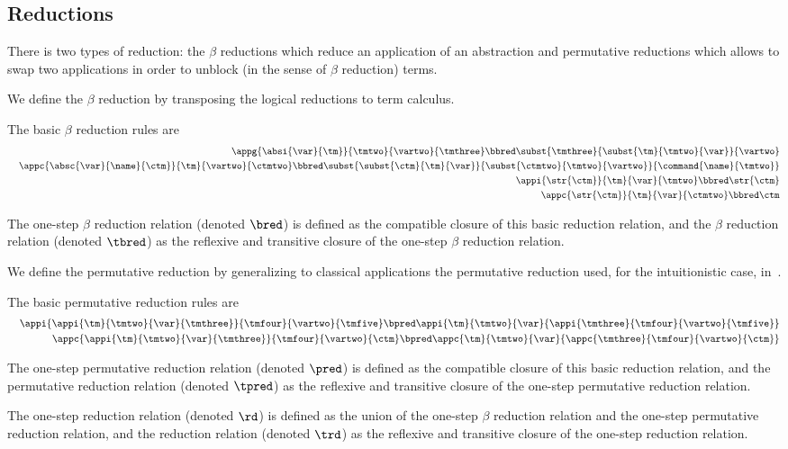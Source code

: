\subsection{Reductions}
There is two types of reduction: the $\beta$ reductions which reduce an application of an abstraction and permutative reductions which allows to swap two applications in order to unblock (in the sense of $\beta$ reduction) terms.

We define the $\beta$ reduction by transposing the logical reductions to term calculus.

\begin{definition}
  The basic $\beta$ reduction rules are
  \begin{eqnarray*}
    &&\appg{\absi{\var}{\tm}}{\tmtwo}{\vartwo}{\tmthree} \bbred \subst{\tmthree}{\subst{\tm}{\tmtwo}{\var}}{\vartwo}\\
    &&\appc{\absc{\var}{\name}{\ctm}}{\tm}{\vartwo}{\ctmtwo} \bbred \subst{\subst{\ctm}{\tm}{\var}}{\subst{\ctmtwo}{\tmtwo}{\vartwo}}{\command{\name}{\tmtwo}}\\
    &&\appi{\str{\ctm}}{\tm}{\var}{\tmtwo} \bbred \str{\ctm}\\
    &&\appc{\str{\ctm}}{\tm}{\var}{\ctmtwo} \bbred \ctm
  \end{eqnarray*}

  The one-step $\beta$ reduction relation (denoted $\bred$) is defined as the compatible closure
  of this basic reduction relation, and the $\beta$ reduction relation (denoted $\tbred$) as the reflexive
  and transitive closure of the one-step $\beta$ reduction relation.
\end{definition}
We define the permutative reduction by generalizing to classical applications the permutative reduction used, for the intuitionistic case, in~\cite{LambdaJ}.

\begin{definition}
  The basic permutative reduction rules are
  \begin{eqnarray*}
    &&\appi{\appi{\tm}{\tmtwo}{\var}{\tmthree}}{\tmfour}{\vartwo}{\tmfive} \bpred \appi{\tm}{\tmtwo}{\var}{\appi{\tmthree}{\tmfour}{\vartwo}{\tmfive}}\\
    &&\appc{\appi{\tm}{\tmtwo}{\var}{\tmthree}}{\tmfour}{\vartwo}{\ctm} \bpred \appc{\tm}{\tmtwo}{\var}{\appc{\tmthree}{\tmfour}{\vartwo}{\ctm}}
  \end{eqnarray*}

  The one-step permutative reduction relation (denoted $\pred$) is defined as the compatible closure
  of this basic reduction relation, and the permutative reduction relation (denoted $\tpred$) as the reflexive
  and transitive closure of the one-step permutative reduction relation.
\end{definition}

\begin{definition}[reduction]
  The one-step reduction relation (denoted $\rd$) is defined as the union of the one-step $\beta$ reduction
  relation and the one-step permutative reduction relation, and the reduction relation (denoted $\trd$) as the reflexive
  and transitive closure of the one-step reduction relation.
\end{definition}